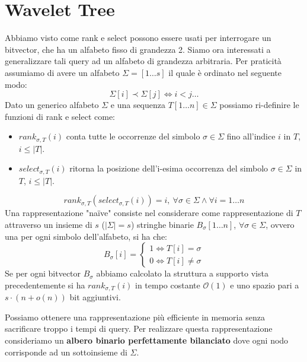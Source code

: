 \section{Wavelet Tree}
Abbiamo visto come rank e select possono essere usati per interrogare un bitvector,
che ha un alfabeto fisso di grandezza 2. Siamo ora interessati a generalizzare
tali query ad un alfabeto di grandezza arbitraria. Per praticità assumiamo di
avere un alfabeto $\Sigma = [1 \dots s]$ il quale è ordinato nel seguente modo:
\begin{equation}
    \Sigma[i] \prec \Sigma[j] \iff i < j \dots
\end{equation}
Dato un generico alfabeto $\Sigma$ e una sequenza $T[1\dots n] \in \Sigma$ possiamo
ri-definire le funzioni di rank e select come:
\begin{itemize}
    \item $rank_{\sigma,T} (i)$ conta tutte le occorrenze del simbolo $\sigma
              \in \Sigma$ fino all'indice $i$ in $T$, $i \leq | T |$.
    \item $select_{\sigma,T} (i)$ ritorna la posizione dell'i-esima occorrenza
          del simbolo $\sigma \in \Sigma$ in $T$, $i \leq | T |$.
\end{itemize}
\begin{equation}
    rank_{\sigma,T} (select_{\sigma,T} (i)) = i, \ \forall \sigma \in \Sigma
    \land \forall i = 1 \dots n
\end{equation}
Una rappresentazione "naïve" consiste nel considerare come rappresentazione di
$T$ attraverso un insieme di $s$ ($| \Sigma | = s$) stringhe binarie $B_\sigma[1
        \dots n]$, $\forall \sigma \in \Sigma$, ovvero una per ogni simbolo dell'alfabeto,
si ha che:
\begin{equation}
    B_\sigma[i] = \begin{cases}
        1 \iff T[i] = \sigma \\
        0 \iff T[i] \neq \sigma
    \end{cases}
\end{equation}
Se per ogni bitvector $B_\sigma$ abbiamo calcolato la struttura a supporto vista
precedentemente si ha $rank_{\sigma,T} (i)$ in tempo costante $\mathcal{O}(1)$ e
uno spazio pari a $s \cdot (n + o(n))$ bit aggiuntivi.

Possiamo ottenere una rappresentazione più efficiente in memoria senza sacrificare
troppo i tempi di query. Per realizzare questa rappresentazione consideriamo un
\textbf{albero binario perfettamente bilanciato} dove ogni nodo corrisponde ad un
sottoinsieme di $\Sigma$.


